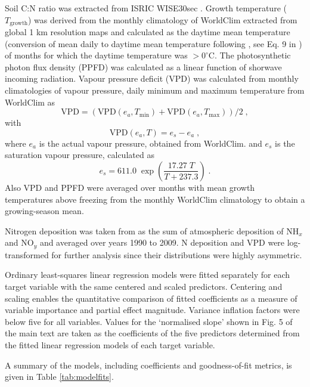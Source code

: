 \documentclass{myreport}
\begin{document}
Soil C:N ratio was extracted from ISRIC WISE30sec \citep{batjes_harmonized_2016}. Growth temperature ($T_\text{growth}$) was derived from the monthly climatology of WorldClim extracted from global 1 km resolution maps \citep{fick_worldclim_2017} and calculated as the daytime mean temperature (conversion of mean daily to daytime mean temperature following \citet{jones_plants_2013}, see Eq. 9 in \citet{dong22jecol}) of months for which the daytime temperature was $>0^\circ$C. The photosynthetic photon flux density (PPFD) was calculated as a linear function of shorwave incoming radiation. Vapour pressure deficit (VPD) was calculated from monthly climatologies of vapour pressure, daily minimum and maximum temperature from WorldClim as
\begin{equation}
\text{VPD} = \left(\text{VPD}(e_a, T_\text{min}) + \text{VPD}(e_a, T_\text{max})\right)/2\;,
\end{equation}
with 
\begin{equation}
\text{VPD}(e_a, T) = e_s - e_a \;,
\end{equation}
where $e_a$ is the actual vapour pressure, obtained from WorldClim. and $e_s$ is the saturation vapour pressure, calculated as
\begin{equation}
e_s = 611.0 \; \exp \left( \frac{17.27 \; T}{T + 237.3} \right) \;.
\end{equation}
Also VPD and PPFD were averaged over months with mean growth temperatures above freezing from the monthly WorldClim climatology to obtain a growing-season mean.

Nitrogen deposition was taken from \citet{lamarque_global_2011} as the sum of atmospheric deposition of NH$_x$ and NO$_y$ and averaged over years 1990 to 2009. N deposition and VPD were log-transformed for further analysis since their distributions were highly asymmetric.

Ordinary least-squares linear regression models were fitted separately for each target variable with the same centered and scaled predictors. Centering and scaling enables the quantitative comparison of fitted coefficients as a measure of variable importance and partial effect magnitude. Variance inflation factors were below five for all variables. Values for the `normalised slope' shown in Fig. 5 of the main text are taken as the coefficients of the five predictors determined from the fitted linear regression models of each target variable.

A summary of the models, including coefficients and goodness-of-fit metrics, is given in Table \ref{tab:modelfits}.



\clearpage

\end{document}
